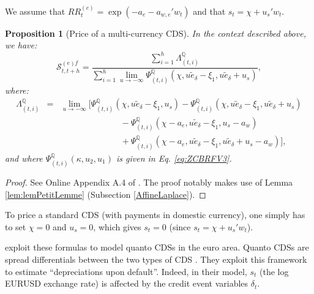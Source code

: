 \documentclass[
  12pt,
]{book}
\newtheorem{proposition}{Proposition}[chapter]
\theoremstyle{definition}
\theoremstyle{definition}
\theoremstyle{definition}
\theoremstyle{definition}
\theoremstyle{remark}
\begin{document}
We assume that \(RR^{(e)}_{t} = \exp \left( - a_{e} - a_{w, e} ' w_t \right)\) and that \(s_t = \chi + u_s ' w_t\).

\begin{proposition}[Price of a multi-currency CDS]
\protect\hypertarget{prp:multicurrencyCDS}{}\label{prp:multicurrencyCDS}In the context described above, we have:
\begin{equation}
\boxed{\mathcal{S}^{(e) f}_{t, t+h} = \frac{\sum_{i=1}^{h} \Lambda^{\mathbb{Q}}_{(t, i)} }{\sum_{i=1}^{h} \lim_{u \to - \infty} \Psi^{\mathbb{Q}}_{(t, i)} \left( \chi, u \tilde{e}_{\delta} - \xi_1 , u \tilde{e}_{\delta} + u_s \right)},}\label{eq:MCCDSformula1}
\end{equation}
where:
\begin{eqnarray*}
\Lambda^{\mathbb{Q}}_{(t, i)} & = & \underset{u \to - \infty}{\lim} \Big[ \Psi^{\mathbb{Q}}_{(t, i)} \left( \chi , u \widetilde{e}_{\delta} - \xi_1 , u_s \right) -
\Psi^{\mathbb{Q}}_{(t, i)} \left( \chi , u \widetilde{e}_{\delta} - \xi_1 , u \widetilde{e}_{\delta} + u_s \right) \\
&& \hspace{7em} - \Psi^{\mathbb{Q}}_{(t, i)} \left(\chi - a_e, u \widetilde{e}_{\delta} - \xi_1 , u_s - a_w \right) \\
&& \hspace{7em} + \Psi^{\mathbb{Q}}_{(t, i)} \left(\chi - a_e, u \widetilde{e}_{\delta} - \xi_1 , u \widetilde{e}_{\delta} + u_s - a_w \right) \Big] ,
\end{eqnarray*}
and where \(\Psi^{\mathbb{Q}}_{(t, i)} \left(\kappa, u_2 , u_1 \right)\) is given in Eq. \eqref{eq:ZCBRFV3}.
\end{proposition}

\begin{proof}
See Online Appendix A.4 of \citet{Monfort_Pegoraro_Renne_Roussellet_2021}. The proof notably makes use of Lemma \ref{lem:lemPetitLemme} (Subsection \ref{AffineLaplace}).
\end{proof}

To price a standard CDS (with payments in domestic currency), one simply has to set \(\chi=0\) and \(u_s=0\), which gives \(s_t=0\) (since \(s_t = \chi + u_s ' w_t\)).

\citet{Monfort_Pegoraro_Renne_Roussellet_2021} exploit these formulas to model quanto CDSs in the euro area. Quanto CDSs are spread differentials between the two types of CDS \citep{Augustin_Chernov_Song_2020}. They exploit this framework to estimate ``depreciations upon default''. Indeed, in their model, \(s_t\) (the log EURUSD exchange rate) is affected by the credit event variables \(\delta_t\).
\end{document}
